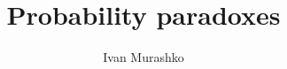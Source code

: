 
\title{Probability paradoxes}
\author{Ivan Murashko}
\date{}


\maketitle
\tableofcontents





  
     



